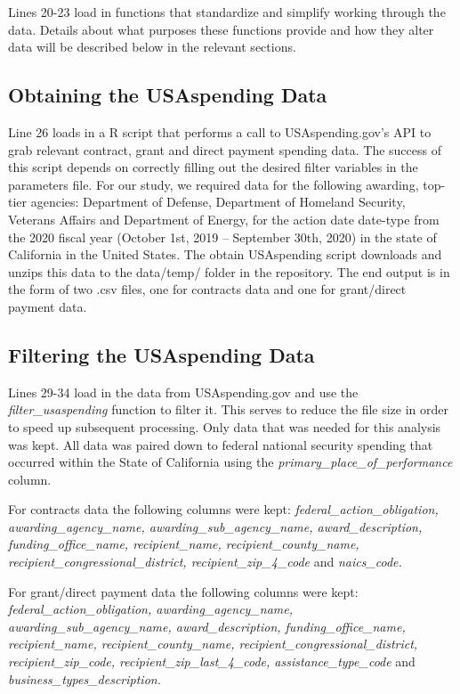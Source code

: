 \documentclass[
]{book}
\begin{document}
Lines 20-23 load in functions that standardize and simplify working through the data. Details about what purposes these functions provide and how they alter data will be described below in the relevant sections.

\hypertarget{obtain-data}{%
\subsection{Obtaining the USAspending Data}\label{obtain-data}}

Line 26 loads in a R script that performs a call to USAspending.gov's API to grab relevant contract, grant and direct payment spending data. The success of this script depends on correctly filling out the desired filter variables in the parameters file. For our study, we required data for the following awarding, top-tier agencies: Department of Defense, Department of Homeland Security, Veterans Affairs and Department of Energy, for the action date date-type from the 2020 fiscal year (October 1st, 2019 -- September 30th, 2020) in the state of California in the United States. The obtain USAspending script downloads and unzips this data to the data/temp/ folder in the repository. The end output is in the form of two .csv files, one for contracts data and one for grant/direct payment data.

\hypertarget{filter-data}{%
\subsection{Filtering the USAspending Data}\label{filter-data}}

Lines 29-34 load in the data from USAspending.gov and use the \emph{filter\_usaspending} function to filter it. This serves to reduce the file size in order to speed up subsequent processing. Only data that was needed for this analysis was kept. All data was paired down to federal national security spending that occurred within the State of California using the \emph{primary\_place\_of\_performance} column.

For contracts data the following columns were kept: \emph{federal\_action\_obligation, awarding\_agency\_name, awarding\_sub\_agency\_name, award\_description, funding\_office\_name, recipient\_name, recipient\_county\_name, recipient\_congressional\_district, recipient\_zip\_4\_code} and \emph{naics\_code.}

For grant/direct payment data the following columns were kept: \emph{federal\_action\_obligation, awarding\_agency\_name, awarding\_sub\_agency\_name, award\_description, funding\_office\_name, recipient\_name, recipient\_county\_name, recipient\_congressional\_district, recipient\_zip\_code, recipient\_zip\_last\_4\_code, assistance\_type\_code} and \emph{business\_types\_description.}
\end{document}
